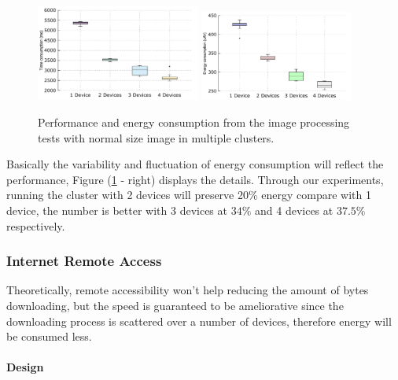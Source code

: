 \documentclass[conference]{IEEEtran}
\begin{document}
\begin{figure}
	\centering
		\includegraphics[width=0.48\textwidth]{data/img_small_perf_full.pdf}
		\includegraphics[width=0.45\textwidth]{data/img_small_energy.pdf}
	\caption{Performance and energy consumption from the image processing tests with normal size image in multiple clusters.}
	\label{fig:small_img_perf}
\end{figure}

Basically the variability and fluctuation of energy consumption will reflect the performance, Figure (\ref{fig:small_img_perf} - right) displays the details. Through our experiments, running the cluster with 2 devices will preserve 20\% energy compare with 1 device, the number is better with 3 devices at $34\%$ and 4 devices at $37.5\%$ respectively.\\


\subsubsection{Internet Remote Access} 
Theoretically, remote accessibility won't help reducing the amount of bytes downloading, but the speed is guaranteed to be ameliorative since the downloading process is scattered over a number of devices, therefore energy will be consumed less. 

\paragraph{Design}
\end{document}
